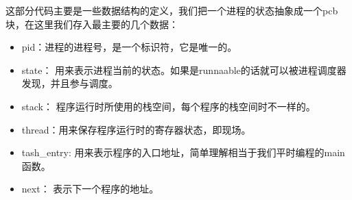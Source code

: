 \documentclass[lang=cn,10pt]{elegantbook}
\begin{document}
这部分代码主要是一些数据结构的定义，我们把一个进程的状态抽象成一个pcb块，在这里我们存入最主要的几个数据：

\begin{itemize}
  \item pid：进程的进程号，是一个标识符，它是唯一的。
  \item state： 用来表示进程当前的状态。如果是runnaable的话就可以被进程调度器发现，并且参与调度。
  \item stack： 程序运行时所使用的栈空间，每个程序的栈空间时不一样的。
  \item thread：用来保存程序运行时的寄存器状态，即现场。
  \item tash\_entry: 用来表示程序的入口地址，简单理解相当于我们平时编程的main函数。
  \item next： 表示下一个程序的地址。
\end{itemize}
\end{document}
